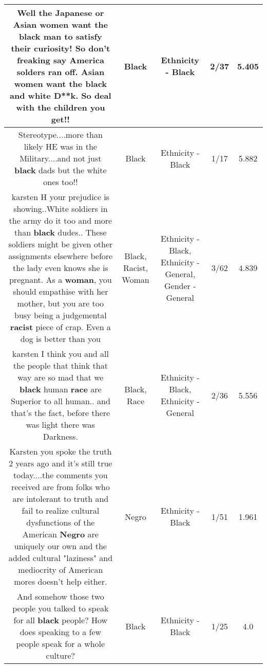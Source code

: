 \documentclass[11pt]{article}
\newlength\mylength
\begin{document}
\begin{center}
\begin{longtable}{|C{.65\mylength}|C{.30\mylength}|C{.12\mylength}|C{.12\mylength}|C{.12\mylength}|}
  \small Well the Japanese or Asian women want the \textbf{black} man to satisfy their curiosity! So don't freaking say America solders ran off. Asian women want the \textbf{black} and white D**k. So deal with the children you get!!\normalsize   & Black & Ethnicity - Black & 2/37 & 5.405 \\  \hline
  \small Stereotype....more than likely HE was in the Military....and not just \textbf{black} dads but the white ones too!!\normalsize   & Black & Ethnicity - Black & 1/17 & 5.882 \\  \hline
  \small karsten H your prejudice is showing..White soldiers in the army do it too and more than \textbf{black} dudes.. These soldiers might  be given other assignments elsewhere before the lady even  knows she is pregnant. As a \textbf{woman}, you should empathise with her mother, but you are too busy being a judgemental \textbf{racist} piece of crap. Even a dog is better than you\normalsize   & Black, Racist, Woman & Ethnicity - Black, Ethnicity - General, Gender - General & 3/62 & 4.839 \\  \hline
  \small karsten I think you and all the people that think that way are so mad that we \textbf{black} human \textbf{race} are  Superior to all human.. and that's the fact, before there was light there was Darkness.\normalsize   & Black, Race & Ethnicity - Black, Ethnicity - General & 2/36 & 5.556 \\  \hline
  \small Karsten you spoke the truth 2 years ago and it's still true today....the comments you received are from folks who are intolerant to truth and fail to realize cultural dysfunctions of the American \textbf{Negro} are uniquely our own and the added cultural "laziness" and mediocrity of American mores doesn't help either.\normalsize   & Negro & Ethnicity - Black & 1/51 & 1.961 \\  \hline
  \small And somehow those two people you talked to speak for all \textbf{black} people? How does speaking to a few people speak for a whole culture?\normalsize   & Black & Ethnicity - Black & 1/25 & 4.0 \\  \hline

\end{longtable}
\end{center}
\end{document}
